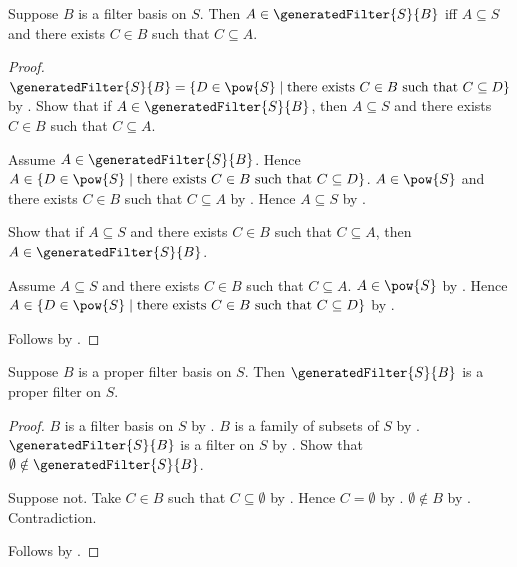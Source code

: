 \begin{theorem}\label{generated_filter_iff}
    Suppose $B$ is a filter basis on $S$.
    Then $A\in\generatedFilter{S}{B}$ iff
        $A\subseteq S$ and
        there exists $C\in B$ such that $C\subseteq A$.
\end{theorem}
\begin{proof}
    $\generatedFilter{S}{B}=
        \{D\in\pow{S}\mid
            \text{there exists $C\in B$ such that $C\subseteq D$}\}$
        by .
    Show that if $A\in\generatedFilter{S}{B}$, then
        $A\subseteq S$ and
        there exists $C\in B$ such that $C\subseteq A$.
    \begin{subproof}
        Assume $A\in\generatedFilter{S}{B}$.
        Hence $A\in\{D\in\pow{S}\mid
            \text{there exists $C\in B$ such that $C\subseteq D$}\}$.
        $A\in\pow{S}$ and
            there exists $C\in B$ such that $C\subseteq A$
            by \auto.
        Hence $A\subseteq S$ by .
    \end{subproof}
    Show that if $A\subseteq S$ and
        there exists $C\in B$ such that $C\subseteq A$, then
        $A\in\generatedFilter{S}{B}$.
    \begin{subproof}
        Assume $A\subseteq S$ and
            there exists $C\in B$ such that $C\subseteq A$.
        $A\in\pow{S}$ by .
        Hence $A\in\{D\in\pow{S}\mid
            \text{there exists $C\in B$ such that $C\subseteq D$}\}$
            by \auto.
    \end{subproof}
    Follows by \auto.
\end{proof}

\begin{theorem}\label{generated_filter_is_proper_filter}
    Suppose $B$ is a proper filter basis on $S$.
    Then $\generatedFilter{S}{B}$ is a proper filter on $S$.
\end{theorem}
\begin{proof}
    $B$ is a filter basis on $S$ by
        .
    $B$ is a family of subsets of $S$ by .
    $\generatedFilter{S}{B}$ is a filter on $S$
        by .
    Show that $\emptyset\notin\generatedFilter{S}{B}$.
    \begin{subproof}
        Suppose not.
        Take $C\in B$ such that $C\subseteq\emptyset$
            by .
        Hence $C=\emptyset$ by .
        $\emptyset\notin B$ by
            .
        Contradiction.
    \end{subproof}
    Follows by .
\end{proof}

